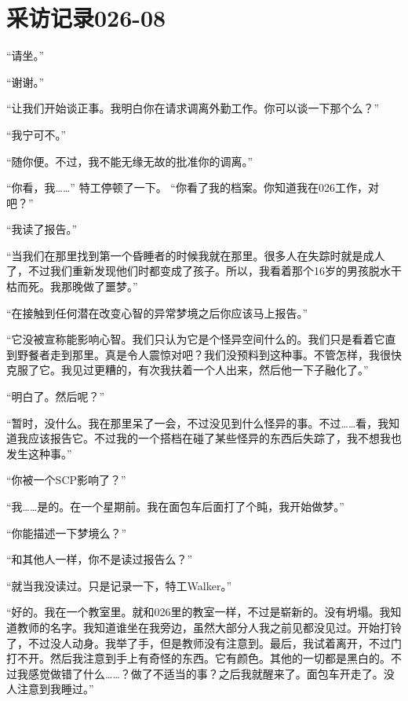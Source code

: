 \section{
    采访记录026-08
}

\label{sec:DOC-interview-log-026-08}

“请坐。”

“谢谢。”

“让我们开始谈正事。我明白你在请求调离外勤工作。你可以谈一下那个么？”

“我宁可不。”

“随你便。不过，我不能无缘无故的批准你的调离。”

“你看，我……” 特工停顿了一下。 “你看了我的档案。你知道我在026工作，对吧？”

“我读了报告。”

“当我们在那里找到第一个昏睡者的时候我就在那里。很多人在失踪时就是成人了，不过我们重新发现他们时都变成了孩子。所以，我看着那个16岁的男孩脱水干枯而死。我那晚做了噩梦。”

“在接触到任何潜在改变心智的异常梦境之后你应该马上报告。”

“它没被宣称能影响心智。我们只认为它是个怪异空间什么的。我们只是看着它直到野餐者走到那里。真是令人震惊对吧？我们没预料到这种事。不管怎样，我很快克服了它。我见过更糟的，有次我扶着一个人出来，然后他一下子融化了。”

“明白了。然后呢？”

“暂时，没什么。我在那里呆了一会，不过没见到什么怪异的事。不过……看，我知道我应该报告它。不过我的一个搭档在碰了某些怪异的东西后失踪了，我不想我也发生这种事。”

“你被一个SCP影响了？”

“我……是的。在一个星期前。我在面包车后面打了个盹，我开始做梦。”

“你能描述一下梦境么？”

“和其他人一样，你不是读过报告么？”

“就当我没读过。只是记录一下，特工Walker。”

“好的。我在一个教室里。就和026里的教室一样，不过是崭新的。没有坍塌。我知道教师的名字。我知道谁坐在我旁边，虽然大部分人我之前见都没见过。开始打铃了，不过没人动身。我举了手，但是教师没有注意到。最后，我试着离开，不过门打不开。然后我注意到手上有奇怪的东西。它有颜色。其他的一切都是黑白的。不过我感觉做错了什么……？做了不适当的事？之后我就醒来了。面包车开走了。没人注意到我睡过。”

